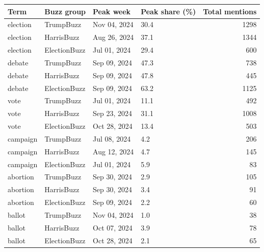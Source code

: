 \begin{tabular}{llllr}
\toprule
Term & Buzz group & Peak week & Peak share (\%) & Total mentions \\
\midrule
election & TrumpBuzz & Nov 04, 2024 & 30.4 & 1298 \\
election & HarrisBuzz & Aug 26, 2024 & 37.1 & 1344 \\
election & ElectionBuzz & Jul 01, 2024 & 29.4 & 600 \\
debate & TrumpBuzz & Sep 09, 2024 & 47.3 & 738 \\
debate & HarrisBuzz & Sep 09, 2024 & 47.8 & 445 \\
debate & ElectionBuzz & Sep 09, 2024 & 63.2 & 1125 \\
vote & TrumpBuzz & Jul 01, 2024 & 11.1 & 492 \\
vote & HarrisBuzz & Sep 23, 2024 & 31.1 & 1008 \\
vote & ElectionBuzz & Oct 28, 2024 & 13.4 & 503 \\
campaign & TrumpBuzz & Jul 08, 2024 & 4.2 & 206 \\
campaign & HarrisBuzz & Aug 12, 2024 & 4.7 & 145 \\
campaign & ElectionBuzz & Jul 01, 2024 & 5.9 & 83 \\
abortion & TrumpBuzz & Sep 30, 2024 & 2.9 & 105 \\
abortion & HarrisBuzz & Sep 30, 2024 & 3.4 & 91 \\
abortion & ElectionBuzz & Sep 09, 2024 & 2.2 & 60 \\
ballot & TrumpBuzz & Nov 04, 2024 & 1.0 & 38 \\
ballot & HarrisBuzz & Oct 07, 2024 & 3.9 & 78 \\
ballot & ElectionBuzz & Oct 28, 2024 & 2.1 & 65 \\
\bottomrule
\end{tabular}
